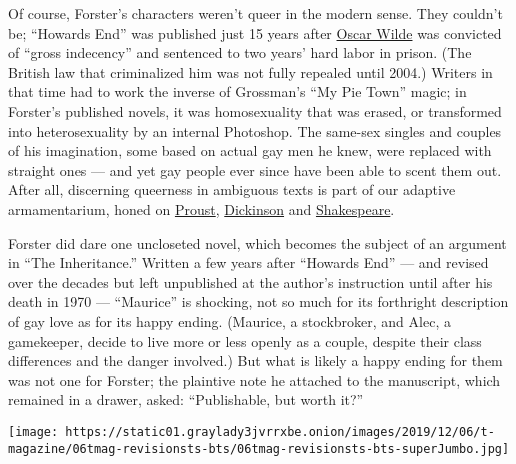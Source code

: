 Of course, Forster's characters weren't queer in the modern sense. They
couldn't be; ``Howards End'' was published just 15 years after
\href{https://www.nytimes3xbfgragh.onion/topic/person/oscar-wilde}{Oscar
Wilde} was convicted of ``gross indecency'' and sentenced to two years'
hard labor in prison. (The British law that criminalized him was not
fully repealed until 2004.) Writers in that time had to work the inverse
of Grossman's ``My Pie Town'' magic; in Forster's published novels, it
was homosexuality that was erased, or transformed into heterosexuality
by an internal Photoshop. The same-sex singles and couples of his
imagination, some based on actual gay men he knew, were replaced with
straight ones --- and yet gay people ever since have been able to scent
them out. After all, discerning queerness in ambiguous texts is part of
our adaptive armamentarium, honed on
\href{https://www.nytimes3xbfgragh.onion/2017/05/15/t-magazine/william-friedkin-marcel-proust.html}{Proust},
\href{https://www.nytimes3xbfgragh.onion/topic/person/emily-dickinson}{Dickinson}
and
\href{https://www.nytimes3xbfgragh.onion/topic/person/william-shakespeare}{Shakespeare}.

Forster did dare one uncloseted novel, which becomes the subject of an
argument in ``The Inheritance.'' Written a few years after ``Howards
End'' --- and revised over the decades but left unpublished at the
author's instruction until after his death in 1970 --- ``Maurice'' is
shocking, not so much for its forthright description of gay love as for
its happy ending. (Maurice, a stockbroker, and Alec, a gamekeeper,
decide to live more or less openly as a couple, despite their class
differences and the danger involved.) But what is likely a happy ending
for them was not one for Forster; the plaintive note he attached to the
manuscript, which remained in a drawer, asked: ``Publishable, but worth
it?''

\texttt{[image: https://static01.graylady3jvrrxbe.onion/images/2019/12/06/t-magazine/06tmag-revisionsts-bts/06tmag-revisionsts-bts-superJumbo.jpg]}

